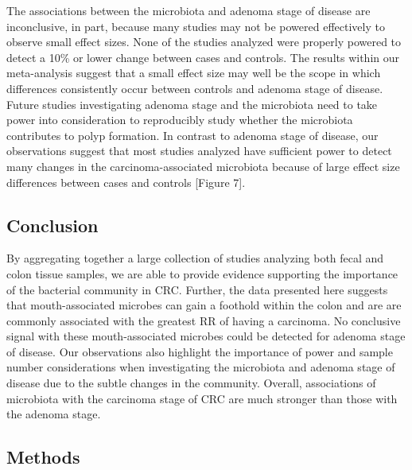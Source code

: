 \documentclass[12pt,]{article}
\begin{document}
The associations between the microbiota and adenoma stage of disease are
inconclusive, in part, because many studies may not be powered
effectively to observe small effect sizes. None of the studies analyzed
were properly powered to detect a 10\% or lower change between cases and
controls. The results within our meta-analysis suggest that a small
effect size may well be the scope in which differences consistently
occur between controls and adenoma stage of disease. Future studies
investigating adenoma stage and the microbiota need to take power into
consideration to reproducibly study whether the microbiota contributes
to polyp formation. In contrast to adenoma stage of disease, our
observations suggest that most studies analyzed have sufficient power to
detect many changes in the carcinoma-associated microbiota because of
large effect size differences between cases and controls {[}Figure 7{]}.

\newpage

\subsection{Conclusion}\label{conclusion}

By aggregating together a large collection of studies analyzing both
fecal and colon tissue samples, we are able to provide evidence
supporting the importance of the bacterial community in CRC. Further,
the data presented here suggests that mouth-associated microbes can gain
a foothold within the colon and are are commonly associated with the
greatest RR of having a carcinoma. No conclusive signal with these
mouth-associated microbes could be detected for adenoma stage of
disease. Our observations also highlight the importance of power and
sample number considerations when investigating the microbiota and
adenoma stage of disease due to the subtle changes in the community.
Overall, associations of microbiota with the carcinoma stage of CRC are
much stronger than those with the adenoma stage.

\newpage

\subsection{Methods}\label{methods}
\end{document}
